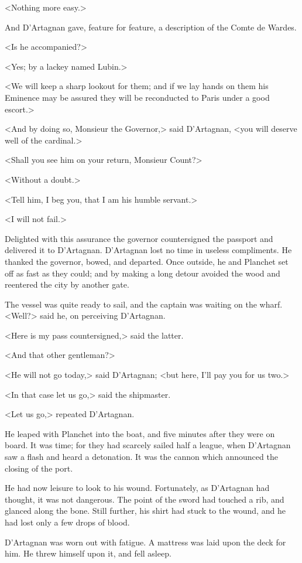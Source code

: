 <Nothing more easy.> 

And D'Artagnan gave, feature for feature, a description of the Comte de Wardes. 

<Is he accompanied?> 

<Yes; by a lackey named Lubin.> 

<We will keep a sharp lookout for them; and if we lay hands on them his Eminence may be assured they will be reconducted to Paris under a good escort.> 

<And by doing so, Monsieur the Governor,> said D'Artagnan, <you will deserve well of the cardinal.> 

<Shall you see him on your return, Monsieur Count?> 

<Without a doubt.> 

<Tell him, I beg you, that I am his humble servant.> 

<I will not fail.> 

Delighted with this assurance the governor countersigned the passport and delivered it to D'Artagnan. D'Artagnan lost no time in useless compliments. He thanked the governor, bowed, and departed. Once outside, he and Planchet set off as fast as they could; and by making a long detour avoided the wood and reentered the city by another gate. 

The vessel was quite ready to sail, and the captain was waiting on the wharf. <Well?> said he, on perceiving D'Artagnan. 

<Here is my pass countersigned,> said the latter. 

<And that other gentleman?>

<He will not go today,> said D'Artagnan; <but here, I'll pay you for us two.> 

<In that case let us go,> said the shipmaster. 

<Let us go,> repeated D'Artagnan. 

He leaped with Planchet into the boat, and five minutes after they were on board. It was time; for they had scarcely sailed half a league, when D'Artagnan saw a flash and heard a detonation. It was the cannon which announced the closing of the port. 

He had now leisure to look to his wound. Fortunately, as D'Artagnan had thought, it was not dangerous. The point of the sword had touched a rib, and glanced along the bone. Still further, his shirt had stuck to the wound, and he had lost only a few drops of blood. 

D'Artagnan was worn out with fatigue. A mattress was laid upon the deck for him. He threw himself upon it, and fell asleep. 

